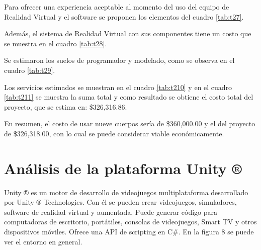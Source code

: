 Para ofrecer una experiencia aceptable al momento del uso del equipo de Realidad Virtual y el software se proponen los elementos del cuadro \ref{tab:t27}.


Además, el sistema de Realidad Virtual con sus componentes tiene un costo que se muestra en el cuadro \ref{tab:t28}.

Se estimaron los suelos de programador y modelado, como se observa en el cuadro \ref{tab:t29}.

Los servicios estimados se muestran en el cuadro \ref{tab:t210} y en el cuadro \ref{tab:t211} se muestra la suma total y como resultado se obtiene el costo total del proyecto, que se estima en: \$326,316.86.

En resumen, el costo de usar nueve cuerpos sería de \$360,000.00 y el del proyecto de \$326,318.00, con lo cual se puede considerar viable económicamente.

\section{Análisis de la plataforma Unity ®}
Unity ® es un motor de desarrollo de videojuegos multiplataforma desarrollado por Unity ® Technologies. Con él se pueden crear videojuegos, simuladores, software de realidad virtual y aumentada. Puede generar código para computadoras de escritorio, portátiles, consolas de videojuegos, Smart TV y otros dispositivos móviles. Ofrece una API de scripting en C\#. En la figura 8 se puede ver el entorno en general.\\
